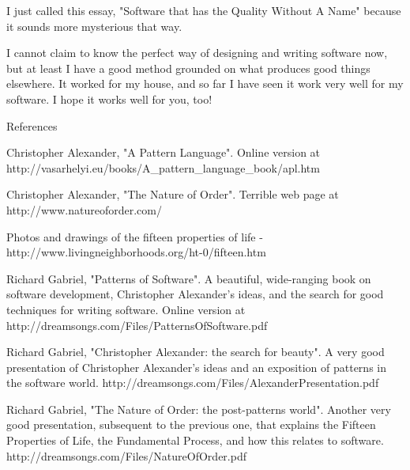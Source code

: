 I just called this essay, "Software that has the Quality Without A Name" because it sounds more mysterious that way.

I cannot claim to know the perfect way of designing and writing software now, but at least I have a good method grounded on what produces good things elsewhere.  It worked for my house, and so far I have seen it work very well for my software.  I hope it works well for you, too!


References

Christopher Alexander, "A Pattern Language".  Online version at http://vasarhelyi.eu/books/A\_pattern\_language\_book/apl.htm

Christopher Alexander, "The Nature of Order".  Terrible web page at http://www.natureoforder.com/

Photos and drawings of the fifteen properties of life - http://www.livingneighborhoods.org/ht-0/fifteen.htm

Richard Gabriel, "Patterns of Software".  A beautiful, wide-ranging book on software development, Christopher Alexander's ideas, and the search for good techniques for writing software.  Online version at http://dreamsongs.com/Files/PatternsOfSoftware.pdf

Richard Gabriel, "Christopher Alexander: the search for beauty".  A very good presentation of Christopher Alexander's ideas and an exposition of patterns in the software world.  http://dreamsongs.com/Files/AlexanderPresentation.pdf

Richard Gabriel, "The Nature of Order: the post-patterns world". Another very good presentation, subsequent to the previous one, that explains the Fifteen Properties of Life, the Fundamental Process, and how this relates to software.  http://dreamsongs.com/Files/NatureOfOrder.pdf
